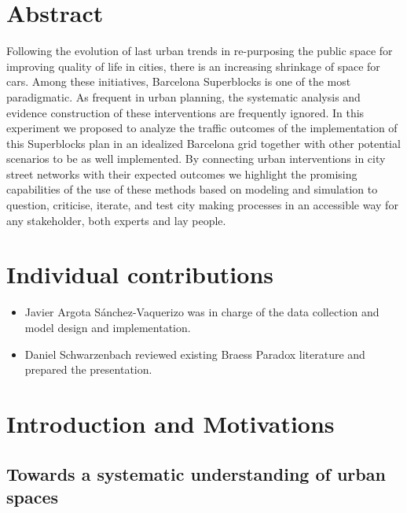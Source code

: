 \documentclass[11pt]{article}
\begin{document}
\section{Abstract}

Following the evolution of last urban trends in re-purposing the public space for improving quality of life in cities, there is an increasing shrinkage of space for cars. Among these initiatives, Barcelona Superblocks is one of the most paradigmatic. As frequent in urban planning, the systematic analysis and evidence construction of these interventions are frequently ignored. In this experiment we proposed to analyze the traffic outcomes of the implementation of this Superblocks plan in an idealized Barcelona grid together with other potential scenarios to be as well implemented. By connecting urban interventions in city street networks with their expected outcomes we highlight the promising capabilities of the use of these methods based on modeling and simulation to question, criticise, iterate, and test city making processes in an accessible way for any stakeholder, both experts and lay people.    

\section{Individual contributions}

\begin{itemize}
\setlength\itemsep{0.05em}
    \item Javier Argota Sánchez-Vaquerizo was in charge of the data collection and model design and implementation.
    \item Daniel Schwarzenbach reviewed existing Braess Paradox literature and prepared the presentation.
\end{itemize}

\section{Introduction and Motivations}

\subsection {Towards a systematic understanding of urban spaces}
\end{document}
